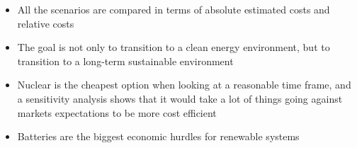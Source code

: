 \begin{kaoboxgreen}[frametitle=Main Takeaways]

\begin{itemize}
\item All the scenarios are compared in terms of absolute estimated costs and relative costs
\item The goal is not only to transition to a clean energy environment, but to transition to a long-term sustainable environment
\item Nuclear is the cheapest option when looking at a reasonable time frame, and a sensitivity analysis shows that it would take a lot of things going against markets expectations to be more cost efficient
\item Batteries are the biggest economic hurdles for renewable systems
\end{itemize}
  
\end{kaoboxgreen}



